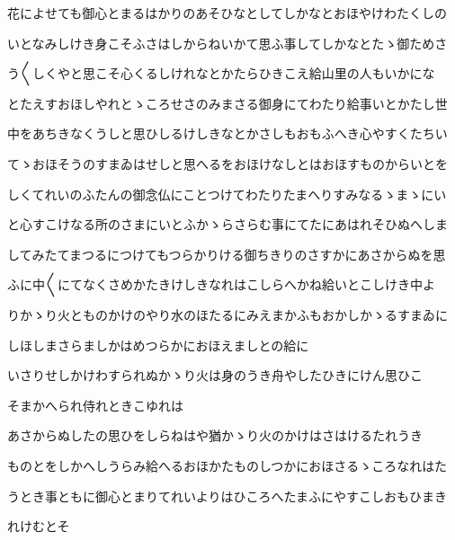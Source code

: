 \documentclass[a4paper,11pt,landscape]{ltjtarticle}
\begin{document}
花によせても御心とまるはかりのあそひなとしてしかなとおほやけわたくしの
\par\medskip
いとなみしけき身こそふさはしからねいかて思ふ事してしかなとたゝ御ためさ
\par\medskip
う〱しくやと思こそ心くるしけれなとかたらひきこえ給山里の人もいかにな
\par\medskip
とたえすおほしやれとゝころせさのみまさる御身にてわたり給事いとかたし世
\par\medskip
中をあちきなくうしと思ひしるけしきなとかさしもおもふへき心やすくたちい
\par\medskip
てゝおほそうのすまゐはせしと思へるをおほけなしとはおほすものからいとを
\par\medskip
しくてれいのふたんの御念仏にことつけてわたりたまへりすみなるゝまゝにい
\par\medskip
と心すこけなる所のさまにいとふかゝらさらむ事にてたにあはれそひぬへしま
\par\medskip
してみたてまつるにつけてもつらかりける御ちきりのさすかにあさからぬを思
\par\medskip
ふに中〱にてなくさめかたきけしきなれはこしらへかね給いとこしけき中よ
\par\medskip
りかゝり火とものかけのやり水のほたるにみえまかふもおかしかゝるすまゐに
\par\medskip
しほしまさらましかはめつらかにおほえましとの給に
\par\medskip
いさりせしかけわすられぬかゝり火は身のうき舟やしたひきにけん思ひこ
\par\medskip
そまかへられ侍れときこゆれは
\par\medskip
あさからぬしたの思ひをしらねはや猶かゝり火のかけはさはけるたれうき
\par\medskip
ものとをしかへしうらみ給へるおほかたものしつかにおほさるゝころなれはた
\par\medskip
うとき事ともに御心とまりてれいよりはひころへたまふにやすこしおもひまき
\par\medskip
れけむとそ
\par\medskip
\end{document}
